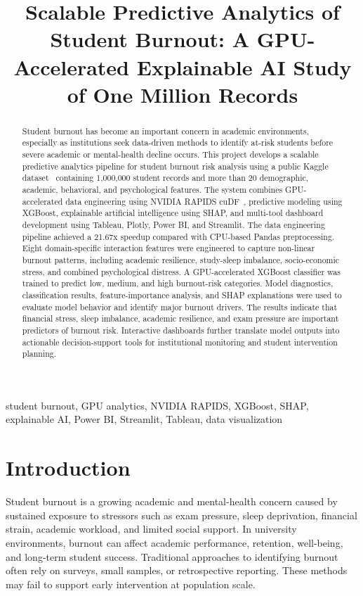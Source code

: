 \documentclass[conference]{IEEEtran}
\title{Scalable Predictive Analytics of Student Burnout: A GPU-Accelerated Explainable AI Study of One Million Records}
\author{
\IEEEauthorblockN{Sanjana Reddy Katham, Xinghan Chen, Abhijith Reddy}
\IEEEauthorblockA{
Data Intelligence and Visualization\\
San Jose State University\\
Email: sanjanareddy.katham@sjsu.edu, xinghan.chen@sjsu.edu, abhijithreddy.barre@sjsu.edu
}
}
\begin{document}
\maketitle

\begin{abstract}
Student burnout has become an important concern in academic environments, especially as institutions seek data-driven methods to identify at-risk students before severe academic or mental-health decline occurs. This project develops a scalable predictive analytics pipeline for student burnout risk analysis using a public Kaggle dataset~\cite{kaggle_student_burnout} containing 1,000,000 student records and more than 20 demographic, academic, behavioral, and psychological features. The system combines GPU-accelerated data engineering using NVIDIA RAPIDS cuDF~\cite{nvidia_rapids}, predictive modeling using XGBoost, explainable artificial intelligence using SHAP, and multi-tool dashboard development using Tableau, Plotly, Power BI, and Streamlit. The data engineering pipeline achieved a 21.67x speedup compared with CPU-based Pandas preprocessing. Eight domain-specific interaction features were engineered to capture non-linear burnout patterns, including academic resilience, study-sleep imbalance, socio-economic stress, and combined psychological distress. A GPU-accelerated XGBoost classifier was trained to predict low, medium, and high burnout-risk categories. Model diagnostics, classification results, feature-importance analysis, and SHAP explanations were used to evaluate model behavior and identify major burnout drivers. The results indicate that financial stress, sleep imbalance, academic resilience, and exam pressure are important predictors of burnout risk. Interactive dashboards further translate model outputs into actionable decision-support tools for institutional monitoring and student intervention planning.
\end{abstract}

\begin{IEEEkeywords}
student burnout, GPU analytics, NVIDIA RAPIDS, XGBoost, SHAP, explainable AI, Power BI, Streamlit, Tableau, data visualization
\end{IEEEkeywords}

\section{Introduction}

Student burnout is a growing academic and mental-health concern caused by sustained exposure to stressors such as exam pressure, sleep deprivation, financial strain, academic workload, and limited social support. In university environments, burnout can affect academic performance, retention, well-being, and long-term student success. Traditional approaches to identifying burnout often rely on surveys, small samples, or retrospective reporting. These methods may fail to support early intervention at population scale.
\end{document}
